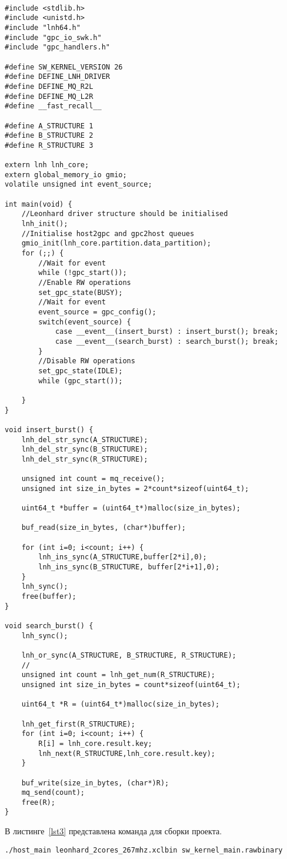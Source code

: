 \begin{lstlisting}[caption={Код программы по индивидуальному варианту sw\_kernel\_main.c}, label=lst2, style=Go]

#include <stdlib.h>
#include <unistd.h>
#include "lnh64.h"
#include "gpc_io_swk.h"
#include "gpc_handlers.h"

#define SW_KERNEL_VERSION 26
#define DEFINE_LNH_DRIVER
#define DEFINE_MQ_R2L
#define DEFINE_MQ_L2R
#define __fast_recall__

#define A_STRUCTURE 1
#define B_STRUCTURE 2
#define R_STRUCTURE 3

extern lnh lnh_core;
extern global_memory_io gmio;
volatile unsigned int event_source;

int main(void) {
    //Leonhard driver structure should be initialised
    lnh_init();
    //Initialise host2gpc and gpc2host queues
    gmio_init(lnh_core.partition.data_partition);
    for (;;) {
        //Wait for event
        while (!gpc_start());
        //Enable RW operations
        set_gpc_state(BUSY);
        //Wait for event
        event_source = gpc_config();
        switch(event_source) {
            case __event__(insert_burst) : insert_burst(); break;
            case __event__(search_burst) : search_burst(); break;
        }
        //Disable RW operations
        set_gpc_state(IDLE);
        while (gpc_start());

    }
}

void insert_burst() {
    lnh_del_str_sync(A_STRUCTURE);
    lnh_del_str_sync(B_STRUCTURE);
    lnh_del_str_sync(R_STRUCTURE);

    unsigned int count = mq_receive();
    unsigned int size_in_bytes = 2*count*sizeof(uint64_t);

    uint64_t *buffer = (uint64_t*)malloc(size_in_bytes);

    buf_read(size_in_bytes, (char*)buffer);

    for (int i=0; i<count; i++) {
        lnh_ins_sync(A_STRUCTURE,buffer[2*i],0);
        lnh_ins_sync(B_STRUCTURE, buffer[2*i+1],0);
    }
    lnh_sync();
    free(buffer);
}

void search_burst() {
    lnh_sync(); 

    lnh_or_sync(A_STRUCTURE, B_STRUCTURE, R_STRUCTURE);
    //
    unsigned int count = lnh_get_num(R_STRUCTURE);
    unsigned int size_in_bytes = count*sizeof(uint64_t);

    uint64_t *R = (uint64_t*)malloc(size_in_bytes);
    
    lnh_get_first(R_STRUCTURE);
    for (int i=0; i<count; i++) {
        R[i] = lnh_core.result.key;
        lnh_next(R_STRUCTURE,lnh_core.result.key);
    }
    
    buf_write(size_in_bytes, (char*)R);   
    mq_send(count);
    free(R);
}

\end{lstlisting}
\par В листинге~\ref{lst3} представлена команда для сборки проекта.
\begin{lstlisting}[caption={Код программы по индивидуальному варианту sw\_kernel\_main.c}, label=lst3, style=Go]
./host_main leonhard_2cores_267mhz.xclbin sw_kernel_main.rawbinary
\end{lstlisting}
\newpage